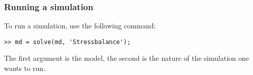 \subsubsection{Running a simulation}
To run a simulation, use the following command:
\begin{lstlisting}
>> md = solve(md, 'Stressbalance');
\end{lstlisting}
The first argument is the model, the second is the nature of the simulation one wants to run.

\clearpage %

